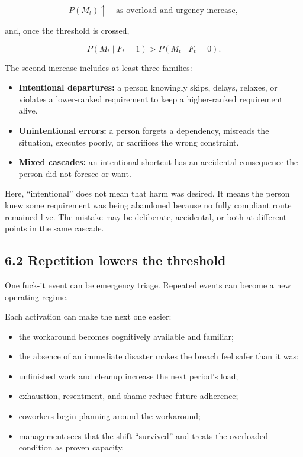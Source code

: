 \documentclass[11pt,oneside]{article}
\providecommand{\tightlist}{%
  \setlength{\itemsep}{0.22em}\setlength{\parskip}{0pt}}
\begin{document}
\[
P(M_t)\uparrow \quad\text{as overload and urgency increase},
\]

and, once the threshold is crossed,

\[
P(M_t\mid F_t=1) > P(M_t\mid F_t=0).
\]

The second increase includes at least three families:

\begin{itemize}
\tightlist
\item
  \textbf{Intentional departures:} a person knowingly skips, delays,
  relaxes, or violates a lower-ranked requirement to keep a
  higher-ranked requirement alive.
\item
  \textbf{Unintentional errors:} a person forgets a dependency, misreads
  the situation, executes poorly, or sacrifices the wrong constraint.
\item
  \textbf{Mixed cascades:} an intentional shortcut has an accidental
  consequence the person did not foresee or want.
\end{itemize}

Here, ``intentional'' does not mean that harm was desired. It means the
person knew some requirement was being abandoned because no fully
compliant route remained live. The mistake may be deliberate,
accidental, or both at different points in the same cascade.

\subsection{6.2 Repetition lowers the
threshold}\label{repetition-lowers-the-threshold}

One fuck-it event can be emergency triage. Repeated events can become a
new operating regime.

Each activation can make the next one easier:

\begin{itemize}
\tightlist
\item
  the workaround becomes cognitively available and familiar;
\item
  the absence of an immediate disaster makes the breach feel safer than
  it was;
\item
  unfinished work and cleanup increase the next period's load;
\item
  exhaustion, resentment, and shame reduce future adherence;
\item
  coworkers begin planning around the workaround;
\item
  management sees that the shift ``survived'' and treats the overloaded
  condition as proven capacity.
\end{itemize}
\end{document}
